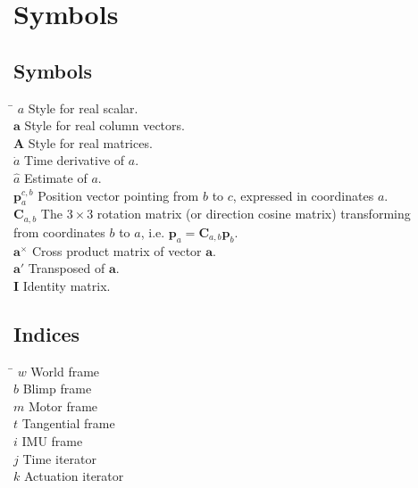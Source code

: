 \chapter*{Symbols}
\label{sec:symbols}

\section*{Symbols}

\begin{tabbing}
 \hspace*{1.6cm} \= \kill
  $a$                     \> Style for real scalar. \\[0.5ex]
  $\mathbf{a}$            \> Style for real column vectors. \\[0.5ex]
  $\mathbf{A}$            \> Style for real matrices. \\[0.5ex]
  $\dot{a}$               \> Time derivative of $a$. \\[0.5ex]
  $\hat{a}$               \> Estimate of $a$. \\[0.5ex]
  $\mathbf{p}^{c,b}_a$    \> Position vector pointing from $b$ to $c$, expressed in coordinates $a$. \\[0.5ex]
  $\mathbf{C}_{a,b}$      \> The $3\times3$ rotation matrix (or direction cosine matrix) transforming \\
                          \> from coordinates $b$ to $a$, i.e. 
                          $\mathbf{p}_a=\mathbf{C}_{a,b}\mathbf{p}_b$. \\ [0.5ex]
  $\mathbf{a}^\times$     \> Cross product matrix of vector $\mathbf{a}$.\\ [0.5ex]
  $\mathbf{a}'$           \> Transposed of $\mathbf{a}$.\\ [0.5ex]
  $\mathbf{I}$            \> Identity matrix.\\ [0.5ex]

\end{tabbing}

\section*{Indices}

\begin{tabbing}
 \hspace*{1.6cm}  \= \kill
 $w$ \> World frame \\[0.5ex]
 $b$ \> Blimp frame \\[0.5ex]
 $m$ \> Motor frame \\[0.5ex]
 $t$ \> Tangential frame \\[0.5ex]
 $i$ \> IMU frame \\[0.5ex]
 $j$ \> Time iterator \\[0.5ex]
 $k$ \> Actuation iterator \\[0.5ex]
\end{tabbing}

